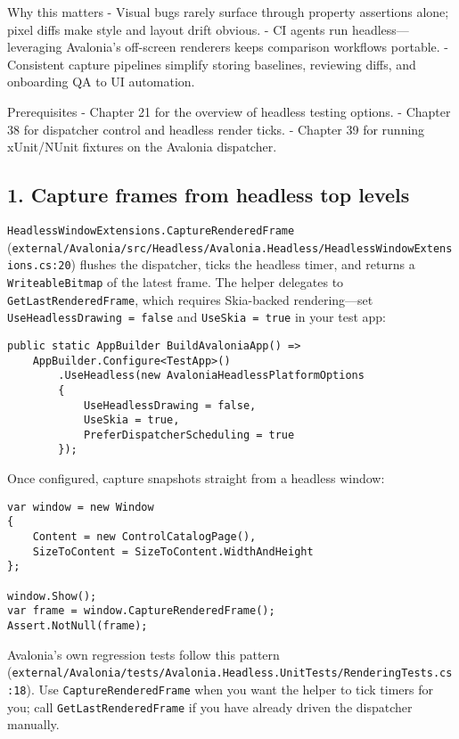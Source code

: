 Why this matters - Visual bugs rarely surface through property
assertions alone; pixel diffs make style and layout drift obvious. - CI
agents run headless---leveraging Avalonia's off-screen renderers keeps
comparison workflows portable. - Consistent capture pipelines simplify
storing baselines, reviewing diffs, and onboarding QA to UI automation.

Prerequisites - Chapter 21 for the overview of headless testing options.
- Chapter 38 for dispatcher control and headless render ticks. - Chapter
39 for running xUnit/NUnit fixtures on the Avalonia dispatcher.

\subsection{1. Capture frames from headless top
levels}\label{capture-frames-from-headless-top-levels}

\passthrough{\lstinline!HeadlessWindowExtensions.CaptureRenderedFrame!}
(\passthrough{\lstinline!external/Avalonia/src/Headless/Avalonia.Headless/HeadlessWindowExtensions.cs:20!})
flushes the dispatcher, ticks the headless timer, and returns a
\passthrough{\lstinline!WriteableBitmap!} of the latest frame. The
helper delegates to \passthrough{\lstinline!GetLastRenderedFrame!},
which requires Skia-backed rendering---set
\passthrough{\lstinline!UseHeadlessDrawing = false!} and
\passthrough{\lstinline!UseSkia = true!} in your test app:

\begin{lstlisting}
public static AppBuilder BuildAvaloniaApp() =>
    AppBuilder.Configure<TestApp>()
        .UseHeadless(new AvaloniaHeadlessPlatformOptions
        {
            UseHeadlessDrawing = false,
            UseSkia = true,
            PreferDispatcherScheduling = true
        });
\end{lstlisting}

Once configured, capture snapshots straight from a headless window:

\begin{lstlisting}
var window = new Window
{
    Content = new ControlCatalogPage(),
    SizeToContent = SizeToContent.WidthAndHeight
};

window.Show();
var frame = window.CaptureRenderedFrame();
Assert.NotNull(frame);
\end{lstlisting}

Avalonia's own regression tests follow this pattern
(\passthrough{\lstinline!external/Avalonia/tests/Avalonia.Headless.UnitTests/RenderingTests.cs:18!}).
Use \passthrough{\lstinline!CaptureRenderedFrame!} when you want the
helper to tick timers for you; call
\passthrough{\lstinline!GetLastRenderedFrame!} if you have already
driven the dispatcher manually.

